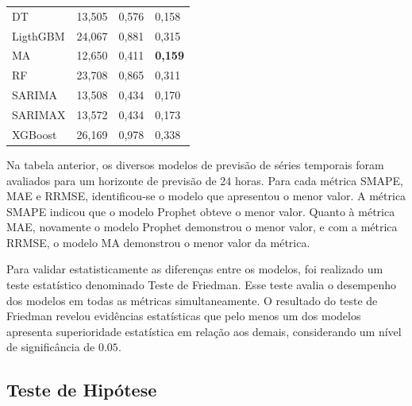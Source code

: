 \begin{table}[!htb]
\begin{tabular}{llll}
		DT                                  & 13,505                             & 0,576                            & 0,158                              \\
		LigthGBM                            & 24,067                             & 0,881                            & 0,315                              \\
		MA                                  & 12,650                             & 0,411                            & \textbf{0,159}                              \\
		RF                                  & 23,708                             & 0,865                            & 0,311                              \\
		SARIMA                              & 13,508                             & 0,434                            & 0,170                              \\
		SARIMAX                             & 13,572                             & 0,434                            & 0,173                              \\
		XGBoost                             & 26,169                             & 0,978                            & 0,338                              \\ \bottomrule

	\end{tabular}
\end{table}

Na tabela anterior, os diversos modelos de previsão de séries temporais foram avaliados para um horizonte de previsão de 24 horas. Para cada métrica SMAPE, MAE e RRMSE, identificou-se o modelo que apresentou o menor valor. A métrica SMAPE indicou que o modelo Prophet obteve o menor valor. Quanto à métrica MAE, novamente o modelo Prophet demonstrou o menor valor, e com a métrica RRMSE, o modelo MA demonstrou o menor valor da métrica.

Para validar estatisticamente as diferenças entre os modelos, foi realizado um teste estatístico denominado Teste de Friedman. Esse teste avalia o desempenho dos modelos em todas as métricas simultaneamente. O resultado do teste de Friedman revelou evidências estatísticas que pelo menos um dos modelos apresenta superioridade estatística em relação aos demais, considerando um nível de significância de $0.05$.



\subsection{Teste de Hip\'otese}

